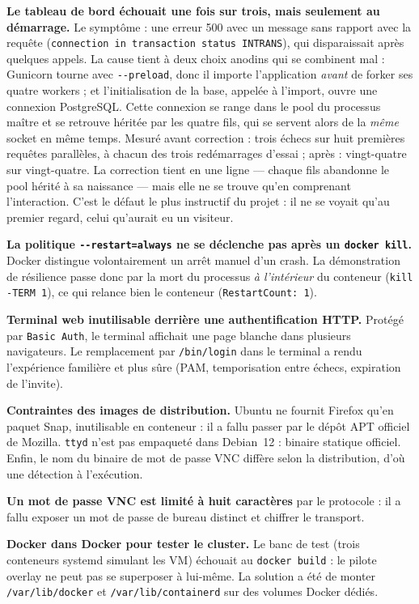\documentclass[11pt,a4paper]{article}
\begin{document}
\textbf{Le tableau de bord échouait une fois sur trois, mais seulement au démarrage.} Le
symptôme : une erreur 500 avec un message sans rapport avec la requête
(\texttt{connection in transaction status INTRANS}), qui disparaissait après quelques appels.
La cause tient à deux choix anodins qui se combinent mal : Gunicorn tourne avec
\texttt{-{}-preload}, donc il importe l'application \emph{avant} de forker ses quatre workers ;
et l'initialisation de la base, appelée à l'import, ouvre une connexion PostgreSQL. Cette
connexion se range dans le pool du processus maître et se retrouve héritée par les quatre fils,
qui se servent alors de la \emph{même} socket en même temps. Mesuré avant correction : trois
échecs sur huit premières requêtes parallèles, à chacun des trois redémarrages d'essai ; après :
vingt-quatre sur vingt-quatre. La correction tient en une ligne --- chaque fils abandonne le pool
hérité à sa naissance --- mais elle ne se trouve qu'en comprenant l'interaction. C'est le défaut
le plus instructif du projet : il ne se voyait qu'au premier regard, celui qu'aurait eu un
visiteur.

\textbf{La politique \texttt{-{}-restart=always} ne se déclenche pas après un \texttt{docker kill}.}
Docker distingue volontairement un arrêt manuel d'un crash. La démonstration de résilience passe
donc par la mort du processus \emph{à l'intérieur} du conteneur (\texttt{kill -TERM 1}), ce qui
relance bien le conteneur (\texttt{RestartCount: 1}).

\textbf{Terminal web inutilisable derrière une authentification HTTP.} Protégé par
\texttt{Basic Auth}, le terminal affichait une page blanche dans plusieurs navigateurs. Le
remplacement par \texttt{/bin/login} dans le terminal a rendu l'expérience familière et plus sûre
(PAM, temporisation entre échecs, expiration de l'invite).

\textbf{Contraintes des images de distribution.} Ubuntu ne fournit Firefox qu'en paquet Snap,
inutilisable en conteneur : il a fallu passer par le dépôt APT officiel de Mozilla. \texttt{ttyd}
n'est pas empaqueté dans Debian~12 : binaire statique officiel. Enfin, le nom du binaire de mot de
passe VNC diffère selon la distribution, d'où une détection à l'exécution.

\textbf{Un mot de passe VNC est limité à huit caractères} par le protocole : il a fallu exposer un
mot de passe de bureau distinct et chiffrer le transport.

\textbf{Docker dans Docker pour tester le cluster.} Le banc de test (trois conteneurs systemd
simulant les VM) échouait au \texttt{docker build} : le pilote overlay ne peut pas se superposer
à lui-même. La solution a été de monter \texttt{/var/lib/docker} et \texttt{/var/lib/containerd}
sur des volumes Docker dédiés.
\end{document}
